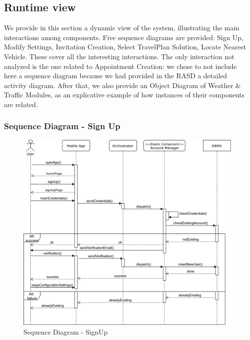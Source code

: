 \subsection{Runtime view}
	\label{sect:RuntimeView}
	We provide in this section a dynamic view of the system, illustrating the main interactions among components.\newline
	Five sequence diagrams are provided: Sign Up, Modify Settings, Invitation Creation, Select TravelPlan Solution, Locate Nearest Vehicle. These cover all the interesting interactions. The only interaction not analyzed is the one related to Appointment Creation: we chose to not include here a sequence diagram because we had provided in the RASD a detailed activity diagram.
	After that, we also provide an Object Diagram of Weather \& Traffic Modules, as an explicative example of how instances of their components are related.

	\subsubsection{Sequence Diagram - Sign Up}
	\label{sect:sd_signUp}
	\begin{figure}[H]
		\centerline{\includegraphics[width=0.9\paperwidth]{Images/signUp}}
		\caption{Sequence Diagram - SignUp}
	\end{figure}
	

